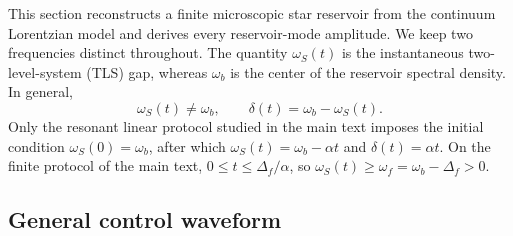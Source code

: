 \documentclass[reprint,superscriptaddress,floatfix,amsmath,amssymb,prresearch,aps]{revtex4-2}
\begin{document}
This section reconstructs a finite microscopic star reservoir
from the continuum Lorentzian model and derives every reservoir-mode
amplitude. We keep two frequencies distinct throughout. The quantity
\(\omega_S(t)\) is the instantaneous two-level-system (TLS) gap, whereas
\(\omega_b\) is the center of the reservoir spectral density. In general,
\begin{equation}
\omega_S(t)\ne\omega_b,
\qquad \delta(t)=\omega_b-\omega_S(t).
\label{eq:s_detuning}
\end{equation}
Only the resonant linear protocol studied in the main text imposes the
initial condition \(\omega_S(0)=\omega_b\), after which
\(\omega_S(t)=\omega_b-\alpha t\) and \(\delta(t)=\alpha t\). On the
finite protocol of the main text,
\(0\leq t\leq\Delta_f/\alpha\), so
\(\omega_S(t)\geq\omega_f=\omega_b-\Delta_f>0\).

\subsection{General control waveform}
\end{document}
